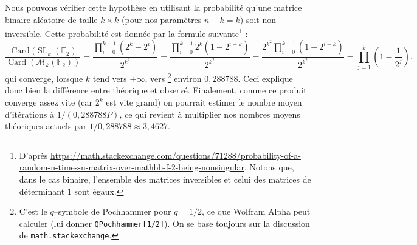 \documentclass[11pt,a4paper]{article}
\newcommand{\F}{\mathbb{F}_2}
\DeclareMathOperator{\Card}{Card}
\begin{document}
Nous pouvons vérifier cette hypothèse en utilisant la probabilité qu'une matrice
binaire aléatoire de taille $k \times k$ (pour nos paramètres $n-k = k$) soit
non inversible. Cette probabilité est donnée par la formule
suivante\footnote{D'après
\url{https://math.stackexchange.com/questions/71288/probability-of-a-random-n-times-n-matrix-over-mathbb-f-2-being-nonsingular}.
Notons que, dans le cas binaire, l'ensemble des matrices inversibles et celui
des matrices de déterminant $1$ sont égaux.} :
\begin{equation*}
  \frac{\Card(\operatorname{SL}_k(\F)}{\Card(\mathcal{M}_k(\F))}
  = \frac{\prod_{i=0}^{k-1}(2^k - 2^i)}{2^{k^2}}
  = \frac{\prod_{i=0}^{k-1}2^k(1 - 2^{i-k})}{2^{k^2}}
  = \frac{2^{k^2}\prod_{i=0}^{k-1}(1 - 2^{i-k})}{2^{k^2}}
  = \prod_{j=1}^{k} \left(1 - \frac{1}{2^j} \right).
\end{equation*}
qui converge, lorsque $k$ tend vers $+\infty$, vers
\footnote{C'est le $q$--symbole de Pochhammer pour $q = 1/2$, ce que Wolfram
Alpha peut calculer (lui donner \texttt{QPochhammer[1/2]}). On se base
toujours sur la discussion de \texttt{math.stackexchange}.}
environ $0,288788$.
Ceci explique donc bien la différence entre théorique et observé.
Finalement, comme ce produit converge assez vite (car $2^k$ est vite grand) on
pourrait estimer le nombre moyen d'itérations à $1/(0,288788P)$, ce qui revient
à multiplier nos nombres moyens théoriques actuels par $1/0,288788 \approx 3,4627$.

%
%
%
\end{document}
